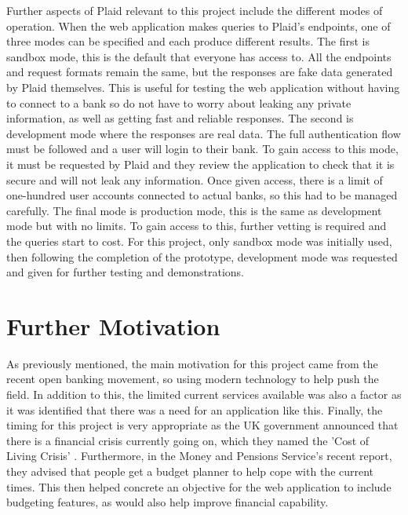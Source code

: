 Further aspects of Plaid relevant to this project include the different modes of operation. When the web application makes queries to Plaid's endpoints, one of three modes can be specified and each produce different results. The first is sandbox mode, this is the default that everyone has access to. All the endpoints and request formats remain the same, but the responses are fake data generated by Plaid themselves. This is useful for testing the web application without having to connect to a bank so do not have to worry about leaking any private information, as well as getting fast and reliable responses. The second is development mode where the responses are real data. The full authentication flow must be followed and a user will login to their bank. To gain access to this mode, it must be requested by Plaid and they review the application to check that it is secure and will not leak any information. Once given access, there is a limit of one-hundred user accounts connected to actual banks, so this had to be managed carefully. The final mode is production mode, this is the same as development mode but with no limits. To gain access to this, further vetting is required and the queries start to cost. For this project, only sandbox mode was initially used, then following the completion of the prototype, development mode was requested and given for further testing and demonstrations.

\section{Further Motivation}
As previously mentioned, the main motivation for this project came from the recent open banking movement, so using modern technology to help push the field. In addition to this, the limited current services available was also a factor as it was identified that there was a need for an application like this. Finally, the timing for this project is very appropriate as the UK government announced that there is a financial crisis currently going on, which they named the 'Cost of Living Crisis' \cite{CostOfLivingCrisisGov}. Furthermore, in the Money and Pensions Service's recent report, they advised that people get a budget planner to help cope with the current times. This then helped concrete an objective for the web application to include budgeting features, as would also help improve financial capability.